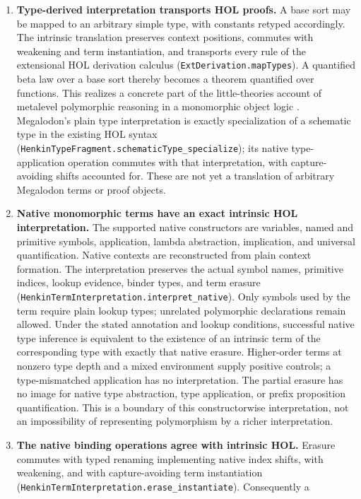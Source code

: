 \documentclass[11pt]{article}
\theoremstyle{definition}
\theoremstyle{remark}
\begin{document}
\begin{enumerate}
\item \textbf{Type-derived interpretation transports HOL proofs.}
  A base sort may be mapped to an arbitrary simple type, with constants
  retyped accordingly. The intrinsic translation preserves context positions,
  commutes with weakening and term instantiation, and transports every rule
  of the extensional HOL derivation calculus
  (\nolinkurl{ExtDerivation.mapTypes}). A quantified beta law over a base
  sort thereby becomes a theorem quantified over functions. This realizes
  a concrete part of the little-theories account of metalevel polymorphic
  reasoning in a monomorphic object logic \cite{FarmerLittleTheories2023}.
  Megalodon's plain type interpretation is exactly specialization of a
  schematic type in the existing HOL syntax
  (\nolinkurl{HenkinTypeFragment.schematicType_specialize}); its native
  type-application operation commutes with that interpretation, with
  capture-avoiding shifts accounted for. These are not yet a translation
  of arbitrary Megalodon terms or proof objects.
\item \textbf{Native monomorphic terms have an exact intrinsic HOL
  interpretation.} The supported native constructors are variables, named
  and primitive symbols, application, lambda abstraction, implication, and
  universal quantification. Native contexts are reconstructed from plain
  context formation. The interpretation preserves the actual symbol names,
  primitive indices, lookup evidence, binder types, and term erasure
  (\nolinkurl{HenkinTermInterpretation.interpret_native}). Only symbols used
  by the term require plain lookup types; unrelated polymorphic declarations
  remain allowed. Under the stated annotation and lookup conditions,
  successful native type inference is equivalent to the existence of an
  intrinsic term of the corresponding type with exactly that native erasure.
  Higher-order terms at nonzero type depth and a mixed environment supply
  positive controls; a type-mismatched application has no interpretation.
  The partial erasure has no image for native type abstraction, type
  application, or prefix proposition quantification. This is a boundary of
  this constructorwise interpretation, not an impossibility of representing
  polymorphism by a richer interpretation.
\item \textbf{The native binding operations agree with intrinsic HOL.}
  Erasure commutes with typed renaming implementing native index shifts,
  with weakening, and with capture-avoiding term instantiation
  (\nolinkurl{HenkinTermInterpretation.erase_instantiate}). Consequently a

\end{enumerate}
\end{document}
